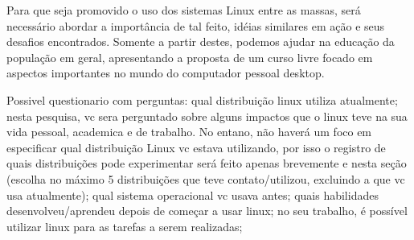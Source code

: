 \documentclass{article}
\begin{document}
Para que seja promovido o uso dos sistemas Linux entre as massas, será necessário abordar a importância de tal feito, idéias similares em ação e seus desafios encontrados. Somente a partir destes, podemos ajudar na educação da população em geral, apresentando a proposta de um curso livre focado em aspectos importantes no mundo do computador pessoal desktop.


Possivel questionario com perguntas: qual distribuição linux utiliza atualmente; nesta pesquisa, vc sera perguntado sobre alguns impactos que o linux teve na sua vida pessoal, academica e de trabalho. No entano, não haverá um foco em especificar qual distribuição Linux vc estava utilizando, por isso o registro de quais distribuições pode experimentar será feito apenas brevemente e nesta seção (escolha no máximo 5 distribuições que teve contato/utilizou, excluindo a que vc usa atualmente); qual sistema operacional vc usava antes; quais habilidades desenvolveu/aprendeu depois de começar a usar linux; no seu trabalho, é possível utilizar linux para as tarefas a serem realizadas;

\medskip

\printbibliography
\end{document}
